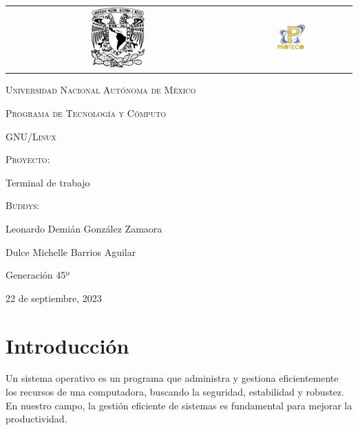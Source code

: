 \documentclass{article}
\begin{document}
\thispagestyle{empty}
\begin{titlepage}
\centering
\begin{center}
\begin{tabular}{c c}
\includegraphics[width=0.25\textwidth]{gg.png}\hspace{5cm}&\hspace{6cm}\includegraphics[width=0.25\textwidth]{download.png}\\
\end{tabular}
\end{center}

{\scshape\LARGE Universidad Nacional Autónoma de México \par}
\vspace{2cm}
{\scshape\Large Programa de Tecnología y Cómputo \par}
{\scshape\Large GNU/Linux \par}
\vspace{2cm}
{\scshape\Large Proyecto: \par}
{\Large Terminal de trabajo \par}
\vfill
{\scshape\Large Buddys: \par}
{\Large Leonardo Demián González Zamaora \par}
{\Large Dulce Michelle Barrios Aguilar \par}

\vfill
{\Large Generación 45º\par}
\vfill
{\Large 22 de septiembre, 2023 \par}
\end{titlepage}
\newpage
\color{black}
\tableofcontents
\newpage 
\section*{Introducción}
Un sistema operativo es un programa que administra y gestiona eficientemente los recursos de una computadora, buscando la seguridad, estabilidad y robustez. En nuestro campo, la gestión eficiente de sistemas es fundamental para mejorar la productividad.\\
\end{document}
